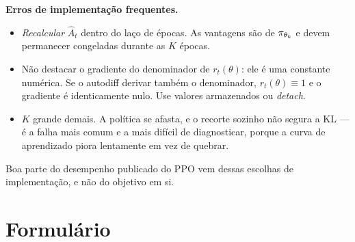 \documentclass[11pt, a4paper]{article}
\newcommand{\Ahat}{\hat{A}}
\begin{document}
\begin{alertabox}
\textbf{Erros de implementação frequentes.}
\begin{itemize}[itemsep=0.1em]
  \item \emph{Recalcular} $\Ahat_t$ dentro do laço de épocas. As vantagens são
        de $\pi_{\theta_k}$ e devem permanecer congeladas durante as $K$ épocas.
  \item Não destacar o gradiente do denominador de $r_t(\theta)$: ele é uma
        constante numérica. Se o autodiff derivar também o denominador,
        $r_t(\theta)\equiv 1$ e o gradiente é identicamente nulo. Use valores
        armazenados ou \emph{detach}.
  \item $K$ grande demais. A política se afasta, e o recorte sozinho não segura
        a KL --- é a falha mais comum e a mais difícil de diagnosticar, porque
        a curva de aprendizado piora lentamente em vez de quebrar.
\end{itemize}
Boa parte do desempenho publicado do PPO vem dessas escolhas de implementação,
e não do objetivo em si.
\end{alertabox}

\section{Formulário}
\end{document}
